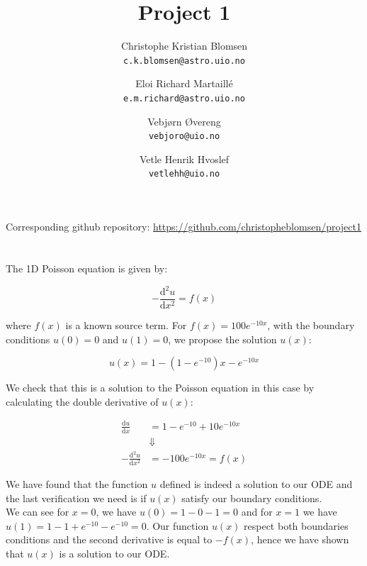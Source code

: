 \documentclass[a4paper,10pt,english]{article}
\author{Christophe Kristian Blomsen\\
    \texttt{c.k.blomsen@astro.uio.no}
    \and
    Eloi Richard Martaillé\\
    \texttt{e.m.richard@astro.uio.no}
    \and
    Vebjørn Øvereng\\
    \texttt{vebjoro@uio.no}
    \and
    Vetle Henrik Hvoslef\\
  \texttt{vetlehh@uio.no}}
\title{Project 1}
\newcommand{\dd}[1]{\mathrm{d}#1}
\begin{document}
\begin{titlepage}
  \maketitle
  \tableofcontents

\end{titlepage}

%


Corresponding github repository: \href{https://github.com/christopheblomsen/project1}{https://github.com/christopheblomsen/project1}

\section{} %

The 1D Poisson equation is given by:

\begin{equation}
  -\frac{\dd{^2u}}{\dd{x^2}} = f(x)
\end{equation}

where $f(x)$ is a known source term.
For $f(x) = 100e^{-10x}$, with the boundary conditions $u(0) = 0$ and $u(1) = 0$, we propose the solution $u(x)$:

\begin{equation}
    u(x) = 1 - (1 - e^{-10})x - e^{-10x}
\end{equation}

We check that this is a solution to the Poisson equation in this case by calculating the double derivative of $u(x)$:

\begin{align*}
  \frac{\dd{u}}{\dd{x}} &= 1 - e^{-10} +10 e^{-10x} \\
  &\Downarrow\\
     -\frac{\dd{^2u}}{\dd{x}^2} &= -100e^{-10x} = f(x)
\end{align*}

We have found that the function $u$ defined is indeed a solution to our ODE and
the last verification we need is if $u(x)$ satisfy our boundary conditions. \\

We can see for $x=0$, we have $u(0)= 1 - 0 -1 =0$ and for $x=1$ we have
$u(1) = 1 - 1 + e^{-10} - e^{-10} = 0$. Our function $u(x)$ respect both
boundaries conditions and the second derivative is equal to $-f(x)$, hence we
have shown that $u(x)$ is a solution to our ODE.

\section{} %
\end{document}
